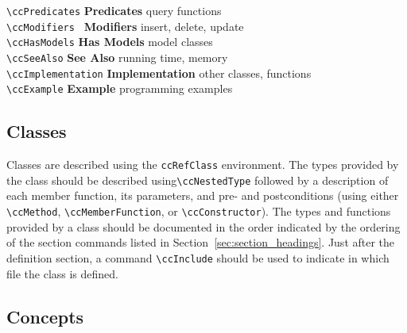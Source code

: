 \begin{tabbing}
  \> \verb+\ccPredicates+      \>  {\bf Predicates}    \>
                                                     query functions\\%
  \> \verb+\ccModifiers +      \>  {\bf Modifiers}    \>
                                                     insert, delete, update\\%
  \> \verb+\ccHasModels+       \>  {\bf Has Models}\>
                                                     model classes\\%
  \> \verb+\ccSeeAlso+         \>  {\bf See Also}\>
                                                     running time, memory\\%
  \> \verb+\ccImplementation+  \>  {\bf Implementation}\>
                                                     other classes, functions\\%
  \> \verb+\ccExample+         \>  {\bf Example}       \>
                                                     programming examples%
\end{tabbing}


\subsection{Classes}
\label{sec:ref_class}

Classes are described using the {\tt ccRefClass} environment.%
The types provided by the class should be described using\verb|\ccNestedType|
followed by a description
of each member function, its parameters, and pre- and postconditions (using 
either \verb|\ccMethod|, \verb|\ccMemberFunction|, or \verb|\ccConstructor|).
The types and functions provided by a class should be documented in the
order indicated by the ordering of the section commands listed in
Section~\ref{sec:section_headings}.
Just after the definition section, a command \verb|\ccInclude| should be
used to indicate in which file the class is defined.

\subsection{Concepts}
\label{sec:ref_concept}

